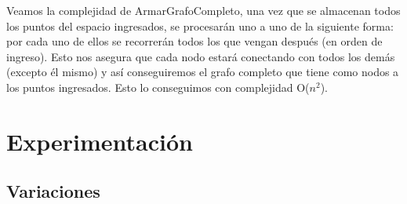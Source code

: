 \documentclass[11pt,a4paper]{article}
\begin{document}
Veamos la complejidad de ArmarGrafoCompleto, una vez que se almacenan todos los puntos del espacio ingresados, se procesarán uno a uno de la siguiente forma: por cada uno de ellos se recorrerán todos los que vengan después (en orden de ingreso). Esto nos asegura que cada nodo estará conectando con todos los demás (excepto él mismo) y así conseguiremos el grafo completo que tiene como nodos a los puntos ingresados. Esto lo conseguimos con complejidad O($n^{2}$). 

\pagebreak

\section{Experimentación}
\subsection{Variaciones}
\end{document}
